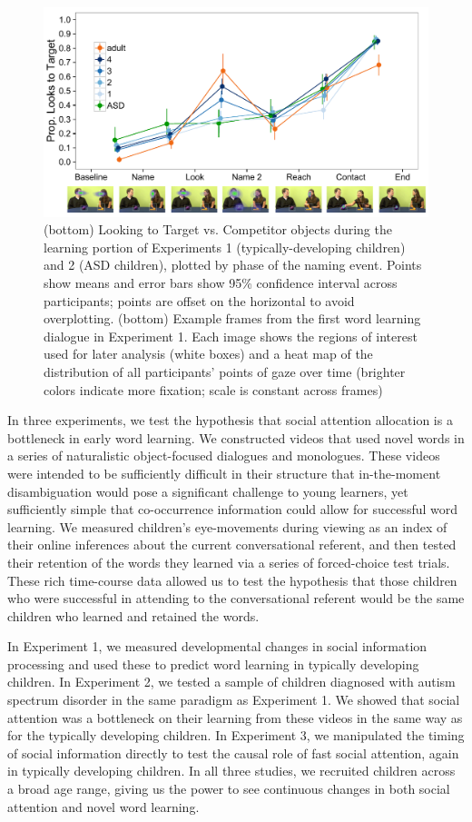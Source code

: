 \documentclass{pnastwo}
\begin{document}
\begin{article}
\begin{figure}
        \includegraphics[width=.95\textwidth]{figures/bronto_all.pdf}
	\caption{\label{fig:reflook_learning} (bottom) Looking to Target vs. Competitor objects during the learning portion of Experiments 1 (typically-developing children) and 2 (ASD children), plotted by phase of the naming event. Points show means and error bars show 95\% confidence interval across participants; points are offset on the horizontal to avoid overplotting. (bottom) Example frames from the first word learning dialogue in Experiment 1. Each image shows the regions of interest used for later analysis (white boxes) and a heat map of the distribution of all participants' points of gaze over time (brighter colors indicate more fixation; scale is constant across frames)}
\end{figure}

In three experiments, we test the hypothesis that social attention allocation is a bottleneck in early word learning. We constructed videos that used novel words in a series of naturalistic object-focused dialogues and monologues. These videos were intended to be sufficiently difficult in their structure that in-the-moment disambiguation would pose a significant challenge to young learners, yet sufficiently simple that co-occurrence information could allow for successful word learning. We measured children's eye-movements during viewing as an index of their online inferences about the current conversational referent, and then tested their retention of the words they learned via a series of forced-choice test trials. These rich time-course data allowed us to test the hypothesis that those children who were successful in attending to the conversational referent would be the same children who learned and retained the words.

In Experiment 1, we measured developmental changes in social information processing and used these to predict word learning in typically developing children. In Experiment 2, we tested a sample of children diagnosed with autism spectrum disorder in the same paradigm as Experiment 1. We showed that social attention was a bottleneck on their learning from these videos in the same way as for the typically developing children. In Experiment 3, we manipulated the timing of social information directly to test the causal role of fast social attention, again in typically developing children. In all three studies, we recruited children across a broad age range, giving us the power to see continuous changes in both social attention and novel word learning.


\end{article}
\end{document}
